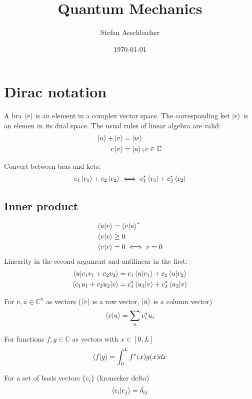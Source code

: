 \documentclass[10pt,a4paper]{book}
\title{Quantum Mechanics}
\author{Stefan Aeschbacher}
\date{\today}
\begin{document}
\maketitle


\chapter{Dirac notation}
A bra $\bra{v}$ is an element in a complex vector space. The corresponding ket $\ket{v}$ is an elemen in its dual space.
The usual rules of linear algebra are valid:
\begin{align}
	\ket{u} + \ket{v} & = \ket{w} \\
	c\ket{v} &= \ket{u}; c \in \mathbb{C}
\end{align}

Convert between bras and kets:
\begin{align}
	c_1 \ket{v_1} + c_2 \ket{v_2} \iff c_1^* \bra{v_1} + c_2^* \bra{v_2}
\end{align}

\section{Inner product}
\begin{align}
	\braket{u|v} & = \braket{v|u}^* \\
	\braket{v|v} & \ge 0 \\
	\braket{v|v} &= 0 \iff v = 0
\end{align}
Linearity in the second argument and antilinear in the first:
\begin{align}
	\braket{u|c_1 v_1 + c_2 v_2} & = c_1\braket{u|v_1} + c_2\braket{u|v_2} \\
	\braket{c_1 u_1 + c_2 u_2|v} & = c_1^*\braket{u_1|v} + c_2^*\braket{u_2|v} \\
\end{align}

For $v, u \in \mathbb{C}^n$ as vectors ($\bra{v}$ is a row vector, $\ket{u}$ is a column vector)
\begin{align}
	\braket{v|u} = \sum_{n}v_i^*u_i
\end{align}

For functions $f, g \in \mathbb{C}$ as vectors with $x \in [0,L]$
\begin{align}
	\braket{f|g} = \int_0^Lf^*(x)g(x)dx
\end{align}

For a set of basis vectors $\{e_i\}$ (kronecker delta)
\begin{align}
	\braket{e_i|e_j} = \delta_{ij}
\end{align}
\end{document}
